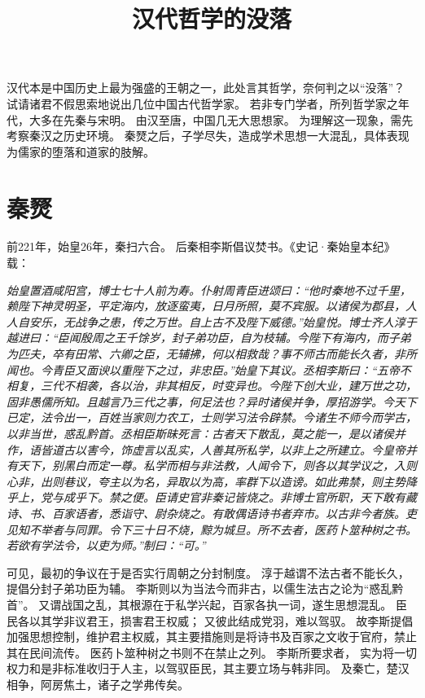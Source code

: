 \documentclass[11pt]{article}
\title{汉代哲学的没落}
\date{}
\begin{document}
  \maketitle

  \linenumbers
  
汉代本是中国历史上最为强盛的王朝之一，此处言其哲学，奈何判之以“没落”？
试请诸君不假思索地说出几位中国古代哲学家。
若非专门学者，所列哲学家之年代，大多在先秦与宋明。
由汉至唐，中国几无大思想家。
为理解这一现象，需先考察秦汉之历史环境。
秦燹之后，子学尽失，造成学术思想一大混乱，具体表现为儒家的堕落和道家的肢解。

\section{秦燹}
前221年，始皇26年，秦扫六合。
后秦相李斯倡议焚书。《史记·秦始皇本纪》载：

\textit{始皇置酒咸阳宫，博士七十人前为寿。仆射周青臣进颂曰：“他时秦地不过千里，赖陛下神灵明圣，平定海内，放逐蛮夷，日月所照，莫不宾服。以诸侯为郡县，人人自安乐，无战争之患，传之万世。自上古不及陛下威德。”始皇悦。博士齐人淳于越进曰：“臣闻殷周之王千馀岁，封子弟功臣，自为枝辅。今陛下有海内，而子弟为匹夫，卒有田常、六卿之臣，无辅拂，何以相救哉？事不师古而能长久者，非所闻也。今青臣又面谀以重陛下之过，非忠臣。”始皇下其议。丞相李斯曰：“五帝不相复，三代不相袭，各以治，非其相反，时变异也。今陛下创大业，建万世之功，固非愚儒所知。且越言乃三代之事，何足法也？异时诸侯并争，厚招游学。今天下已定，法令出一，百姓当家则力农工，士则学习法令辟禁。今诸生不师今而学古，以非当世，惑乱黔首。丞相臣斯昧死言：古者天下散乱，莫之能一，是以诸侯并作，语皆道古以害今，饰虚言以乱实，人善其所私学，以非上之所建立。今皇帝并有天下，别黑白而定一尊。私学而相与非法教，人闻令下，则各以其学议之，入则心非，出则巷议，夸主以为名，异取以为高，率群下以造谤。如此弗禁，则主势降乎上，党与成乎下。禁之便。臣请史官非秦记皆烧之。非博士官所职，天下敢有藏诗、书、百家语者，悉诣守、尉杂烧之。有敢偶语诗书者弃市。以古非今者族。吏见知不举者与同罪。令下三十日不烧，黥为城旦。所不去者，医药卜筮种树之书。若欲有学法令，以吏为师。”制曰：“可。”}

可见，最初的争议在于是否实行周朝之分封制度。
淳于越谓不法古者不能长久，提倡分封子弟功臣为辅。
李斯则以为当法今而非古，以儒生法古之论为“惑乱黔首”。
又谓战国之乱，其根源在于私学兴起，百家各执一词，遂生思想混乱。
臣民各以其学非议君王，损害君王权威；
又彼此结成党羽，难以驾驭。
故李斯提倡加强思想控制，维护君主权威，其主要措施则是将诗书及百家之文收于官府，禁止其在民间流传。
医药卜筮种树之书则不在禁止之列。
李斯所要求者， 实为将一切权力和是非标准收归于人主，以驾驭臣民，其主要立场与韩非同。
及秦亡，楚汉相争，阿房焦土，诸子之学弗传矣。
\end{document}
